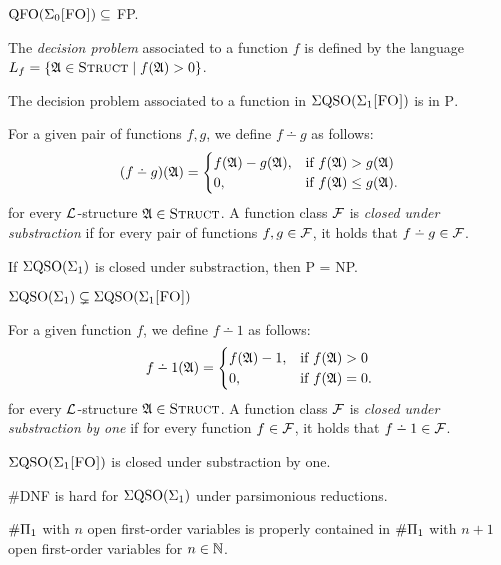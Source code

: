 \begin{theorem} \label{fp1}
	${\rm QFO}(\Sigma_{0}\textsc{[FO]}) \subseteq$ {\sc FP}.
\end{theorem}

The {\em decision problem} associated to a function $f$ is defined by the language $L_f = \{\mathfrak{A} \in \text{\sc Struct} \mid f(\mathfrak{A}) > 0\}$.

\begin{theorem} \label{decisionptime}
	The decision problem associated to a function in $\Sigma{\rm QSO}(\Sigma_{1}\textsc{[FO]})$ is in \textsc{P}.
\end{theorem}

For a given pair of functions $f,g$, we define $f \dotminus g$ as follows:
\begin{eqnarray*}
	(f \dotminus g)(\A) =
	\begin{cases}
		f(\A)-g(\A), & \text{if }f(\A)>g(\A) \\
		0, & \text{if }f(\A) \leq g(\A).
	\end{cases}
\end{eqnarray*}
for every $\L$-structure $\mathfrak{A} \in \text{\sc Struct}$. A function class $\F$ is {\em closed under substraction} if for every pair of functions $f,g \in \F$, it holds that $f \dotminus g \in \F$.

\begin{theorem} \label{sub-pnp}
	If $\Sigma{\rm QSO}(\Sigma_{1})$ is closed under substraction, then {\sc P} = {\sc NP}.
\end{theorem}

\begin{theorem} \label{sigma1strict}
	$\Sigma{\rm QSO}(\Sigma_{1}) \subsetneq \Sigma{\rm QSO}(\Sigma_{1}\textsc{[FO]})$
\end{theorem}

For a given function $f$, we define $f \dotminus 1$ as follows:
\begin{eqnarray*}
	f \dotminus 1(\A) =
	\begin{cases}
		f(\A)-1, & \text{if }f(\A) > 0 \\
		0, & \text{if }f(\A) = 0.
	\end{cases}
\end{eqnarray*}
for every $\L$-structure $\mathfrak{A} \in \text{\sc Struct}$. A function class $\F$ is {\em closed under substraction by one} if for every function $f \in \F$, it holds that $f \dotminus 1 \in \F$.

\begin{theorem} \label{sigmafo-minusone}
	$\Sigma{\rm QSO}(\Sigma_{1}\textsc{[FO]})$ is closed under substraction by one.
\end{theorem}

\begin{theorem} \label{dnf-pars}
	{\sc \#DNF} is hard for $\Sigma{\rm QSO}(\Sigma_{1})$ under parsimonious reductions. 
\end{theorem}

\begin{theorem} \label{nplusone-strict}
	$\#\Pi_{1}$ with $n$ open first-order variables is properly contained in $\#\Pi_{1}$ with $n+1$ open first-order variables for $n\in\mathbb{N}$.  
\end{theorem}